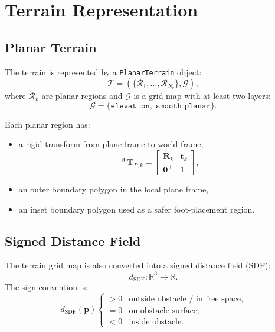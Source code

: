 \documentclass[11pt,a4paper]{article}
\newcommand{\R}{\mathbb{R}}
\begin{document}

\section{Terrain Representation}

\subsection{Planar Terrain}

The terrain is represented by a \texttt{PlanarTerrain} object:
\begin{equation}
	\mathcal{T}
	=
	\left(
		\{\mathcal{R}_1,\ldots,\mathcal{R}_{N_r}\},
		\mathcal{G}
	\right),
\end{equation}
where $\mathcal{R}_k$ are planar regions and $\mathcal{G}$ is a grid map with at least two layers:
\begin{equation}
	\mathcal{G}
	=
	\{\texttt{elevation},\;\texttt{smooth\_planar}\}.
\end{equation}

Each planar region has:
\begin{itemize}
	\item a rigid transform from plane frame to world frame,
	      \begin{equation}
		      {}^W\bm{T}_{P,k}
		      =
		      \begin{bmatrix}
			      \bm{R}_k & \bm{t}_k\\
			      \bm{0}^{\top} & 1
		      \end{bmatrix},
	      \end{equation}
	\item an outer boundary polygon in the local plane frame,
	\item an inset boundary polygon used as a safer foot-placement region.
\end{itemize}

\subsection{Signed Distance Field}

The terrain grid map is also converted into a signed distance field (SDF):
\begin{equation}
	d_{\text{SDF}}:\R^3\rightarrow\R.
\end{equation}
The sign convention is:
\begin{equation}
	d_{\text{SDF}}(\bm{p})
	\begin{cases}
		>0 & \text{outside obstacle / in free space},\\
		=0 & \text{on obstacle surface},\\
		<0 & \text{inside obstacle}.
	\end{cases}
\end{equation}
\end{document}
